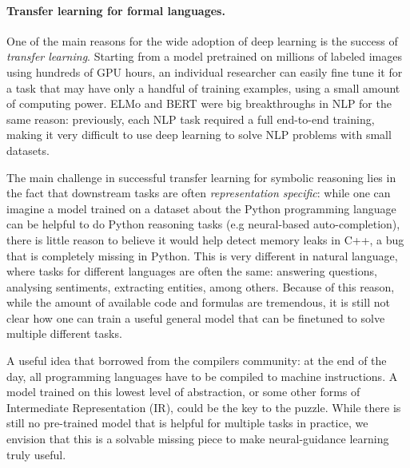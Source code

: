 \paragraph{Transfer learning for formal languages.} 
One of the main reasons for the wide adoption of deep learning is the success of \emph{transfer learning}. Starting from a model pretrained on millions of labeled images using hundreds of GPU hours, an individual researcher can easily fine tune it for a task that may have only a handful of training examples, using a small amount of computing power. ELMo \cite{elmo} and BERT \cite{bert} were big breakthroughs in NLP for the same reason: previously, each NLP task required a full end-to-end training, making it very difficult to use deep learning to solve NLP problems with small datasets. 

The main challenge in successful transfer learning for symbolic reasoning lies in the fact that downstream tasks are often \emph{representation specific}: while one can imagine a model trained on a dataset about the Python programming language can be helpful to do Python reasoning tasks (e.g neural-based auto-completion), there is little reason to believe it would help detect memory leaks in C++, a bug that is completely missing in Python. This is very different in natural language, where tasks for different languages are often the same: answering questions, analysing sentiments, extracting entities, among others. Because of this reason, while the amount of available code and formulas are tremendous, it is still not clear how one can train a useful general model that can be finetuned to solve multiple different tasks. 

A useful idea that borrowed from the compilers community: at the end of the day, all programming languages have to be compiled to machine instructions. A model trained on this lowest level of abstraction, or some other forms of Intermediate Representation (IR), could be the key to the puzzle. While there is still no pre-trained model that is helpful for multiple tasks in practice, we envision that this is a solvable missing piece to make neural-guidance learning truly useful.
